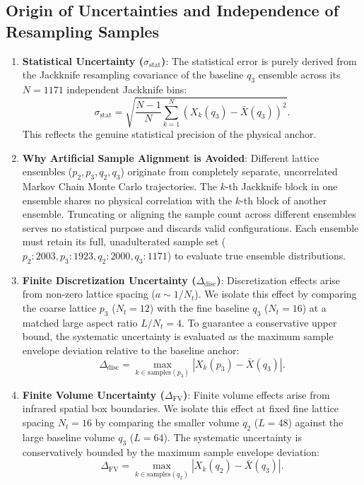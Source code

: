\documentclass[11pt,a4paper]{article}
\begin{document}
\subsection{Origin of Uncertainties and Independence of Resampling Samples}
\begin{enumerate}
    \item \textbf{Statistical Uncertainty ($\sigma_{\mathrm{stat}}$)}:
    The statistical error is purely derived from the Jackknife resampling covariance of the baseline $q_3$ ensemble across its $N = 1171$ independent Jackknife bins:
    \begin{equation}
        \sigma_{\mathrm{stat}} = \sqrt{\frac{N-1}{N} \sum_{k=1}^N \left( X_k(q_3) - \bar{X}(q_3) \right)^2}.
    \end{equation}
    This reflects the genuine statistical precision of the physical anchor.
    \item \textbf{Why Artificial Sample Alignment is Avoided}:
    Different lattice ensembles ($p_2, p_3, q_2, q_3$) originate from completely separate, uncorrelated Markov Chain Monte Carlo trajectories. The $k$-th Jackknife block in one ensemble shares no physical correlation with the $k$-th block of another ensemble. Truncating or aligning the sample count across different ensembles serves no statistical purpose and discards valid configurations. Each ensemble must retain its full, unadulterated sample set ($p_2: 2003, p_3: 1923, q_2: 2000, q_3: 1171$) to evaluate true ensemble distributions.
    \item \textbf{Finite Discretization Uncertainty ($\Delta_{\mathrm{disc}}$)}:
    Discretization effects arise from non-zero lattice spacing ($a \sim 1/N_t$). We isolate this effect by comparing the coarse lattice $p_3$ ($N_t=12$) with the fine baseline $q_3$ ($N_t=16$) at a matched large aspect ratio $L/N_t = 4$. To guarantee a conservative upper bound, the systematic uncertainty is evaluated as the maximum sample envelope deviation relative to the baseline anchor:
    \begin{equation}
        \Delta_{\mathrm{disc}} = \max_{k \in \mathrm{samples}(p_3)} |X_k(p_3) - \bar{X}(q_3)|.
    \end{equation}
    \item \textbf{Finite Volume Uncertainty ($\Delta_{\mathrm{FV}}$)}:
    Finite volume effects arise from infrared spatial box boundaries. We isolate this effect at fixed fine lattice spacing $N_t=16$ by comparing the smaller volume $q_2$ ($L=48$) against the large baseline volume $q_3$ ($L=64$). The systematic uncertainty is conservatively bounded by the maximum sample envelope deviation:
    \begin{equation}
        \Delta_{\mathrm{FV}} = \max_{k \in \mathrm{samples}(q_2)} |X_k(q_2) - \bar{X}(q_3)|.
    \end{equation}
\end{enumerate}
\end{document}
